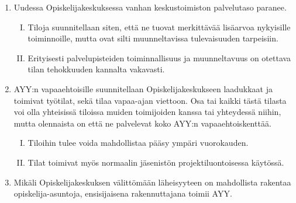 \documentclass[a4paper, 12pt, finnish]{report}
\begin{document}
\begin{enumerate}
    \item{Uudessa Opiskelijakeskuksessa vanhan keskustoimiston palvelutaso paranee.}
        \begin{enumerate}[I.]
            \item{Tiloja suunnitellaan siten, että ne tuovat merkittävää lisäarvoa nykyisille toiminnoille, mutta ovat silti muunneltavissa tulevaisuuden tarpeisiin.}
            \item{Erityisesti palvelupisteiden toiminnallisuus ja muunneltavuus on otettava tilan tehokkuuden kannalta vakavasti.}
        \end{enumerate}
    \item{AYY:n vapaaehtoisille suunnitellaan Opiskelijakeskukseen laadukkaat ja toimivat työtilat, sekä tilaa vapaa-ajan viettoon. Osa tai kaikki tästä tilasta voi olla yhteisissä tiloissa muiden toimijoiden kanssa tai yhteydessä niihin, mutta olennaista on että ne palvelevat koko AYY:n vapaaehtoiskenttää.}
        \begin{enumerate}[I.]
            \item{Tiloihin tulee voida mahdollistaa pääsy ympäri vuorokauden.}
            \item{Tilat toimivat myös normaalin jäsenistön projektiluontoisessa käytössä.}
        \end{enumerate}

    \item{Mikäli Opiskelijakeskuksen välittömään läheisyyteen on mahdollista rakentaa opiskelija-asuntoja, ensisijaisena rakennuttajana toimii AYY.}
\end{enumerate}


\newpage
\end{document}
